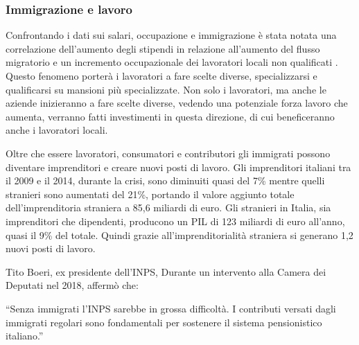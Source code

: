 \documentclass[12pt]{book} %
\begin{document}
\bigskip

\subsubsection{Immigrazione e lavoro}
Confrontando i dati sui salari, occupazione e immigrazione è stata notata una correlazione dell'aumento degli stipendi
in relazione all'aumento del flusso migratorio e un incremento occupazionale dei lavoratori locali non qualificati    .
Questo fenomeno porterà i lavoratori a fare scelte diverse, specializzarsi e qualificarsi su mansioni più specializzate. 
Non solo i lavoratori, ma anche le aziende inizieranno a fare scelte diverse, vedendo una potenziale forza
lavoro che aumenta, verranno fatti investimenti in questa direzione, di cui beneficeranno anche i lavoratori locali.

Oltre che essere lavoratori, consumatori e contributori gli immigrati possono diventare imprenditori e creare nuovi
posti di lavoro.
Gli imprenditori italiani tra il 2009 e il 2014, durante la crisi, sono diminuiti quasi del 7\% mentre quelli stranieri
sono aumentati del 21\%, portando il valore aggiunto
totale dell'imprenditoria straniera a 85,6 miliardi di
euro. 
Gli stranieri in Italia, sia imprenditori che dipendenti, producono un PIL di 123 miliardi di euro all'anno, quasi il 9\% del
totale. Quindi grazie all'imprenditorialità straniera si generano 1,2 nuovi posti di lavoro. 

Tito Boeri, ex presidente dell'INPS, Durante un intervento alla Camera dei Deputati nel 2018, affermò che:

“Senza immigrati l’INPS sarebbe in grossa difficoltà. I contributi versati dagli immigrati regolari sono fondamentali per sostenere il sistema pensionistico italiano.”
\end{document}
